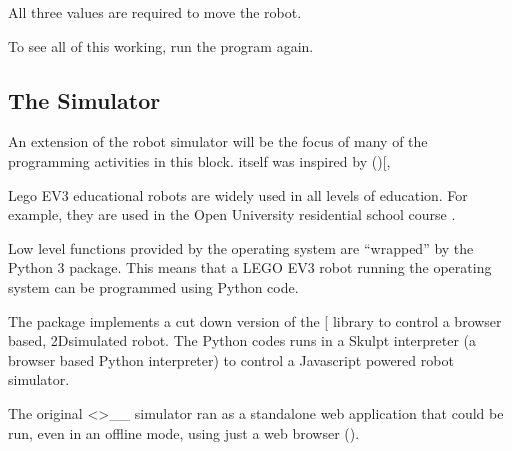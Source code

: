 \documentclass[letterpaper,10pt,english]{sphinxmanual}
\begin{document}
All three values are required to move the robot.

To see all of this working, run the program again.


\subsection{The  Simulator}
\label{\detokenize{content/00_SOFTWARE_GUIDE/Section_00_02_ev3devsim_simulator_overview:The-ev3devsim-Simulator}}\label{\detokenize{content/00_SOFTWARE_GUIDE/Section_00_02_ev3devsim_simulator_overview::doc}}
An extension of the  robot simulator will be the focus of many of the programming activities in this block.  itself was inspired by (){[}\sphinxcode{\sphinxupquote{https://www.ev3dev.org/}}{]}, 

Lego EV3 educational robots are widely used in all levels of education. For example, they are used in the Open University residential school course .

Low level functions provided by the  operating system are “wrapped” by the  Python 3 package. This means that a LEGO EV3 robot running the  operating system can be programmed using Python code.

The  package implements a cut down version of the {[}\sphinxcode{\sphinxupquote{ev3dev\sphinxhyphen{}lang\sphinxhyphen{}python}}{]} library to control a browser based, 2D\sphinxhyphen{}simulated robot. The  Python codes runs in a Skulpt interpreter (a browser based Python interpreter) to control a Javascript powered robot simulator.

The original  \textless{}\textgreater{}\textasciigrave{}\_\_ simulator ran as a standalone web application that could be run, even in an offline mode, using just a web browser ().
\end{document}
